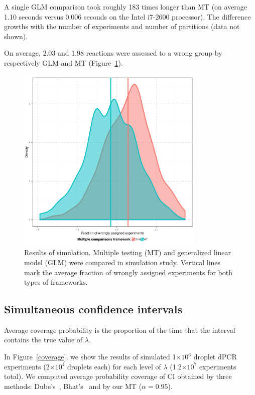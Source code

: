 \documentclass[a4,center,fleqn]{NAR}
\providecommand{\e}[1]{\ensuremath{\times 10^{#1}}}
\begin{document}
A single GLM comparison took roughly 183 times 
longer than MT (on average 1.10 seconds versus 0.006 seconds on the Intel 
i7-2600 processor). The difference growths with the number of experiments and 
number of partitions (data not shown).

On average, 2.03 and 1.98 reactions were assessed to a wrong group by 
respectively GLM and MT (Figure~\ref{ratiovsGLM}).


\begin{figure}[t]
\begin{center}
\includegraphics[width=9cm]{ratiovsGLM.pdf}
\end{center}
\caption{Results of simulation. Multiple testing (MT) and generalized linear model (GLM) were compared in simulation study. Vertical lines mark the average fraction of wrongly assigned experiments for both types of frameworks.}
\label{ratiovsGLM}
\end{figure}


\subsection{Simultaneous confidence intervals}

Average coverage probability is the proportion of the time that the interval 
contains the true value of $\lambda$.

In Figure~\ref{coverage}, we show the results of simulated 1\e{6} droplet dPCR experiments (2\e{4} 
droplets each) for each level of $\lambda$ (1.2\e{7} experiments total). We 
computed average probability coverage of CI obtained by three methods: 
Dube's~\citep{dube_mathematical_2008}, Bhat's~\citep{bhat_single_2009} and by 
our MT ($\alpha = 0.95$).
\end{document}
